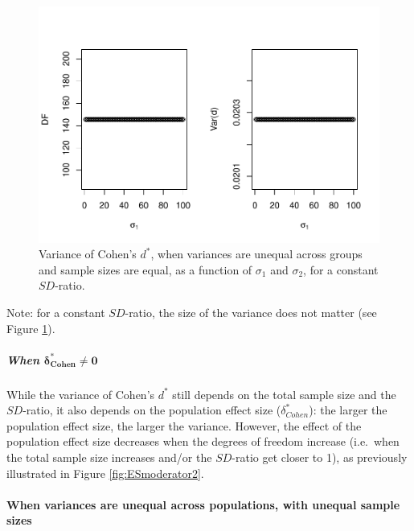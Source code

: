 \documentclass[
  english,
  man,mask]{apa6}
\let\oldparagraph\paragraph
\renewcommand{\paragraph}[1]{\oldparagraph{#1}\mbox{}}
\let\oldsubparagraph\subparagraph
\renewcommand{\subparagraph}[1]{\oldsubparagraph{#1}\mbox{}}
\begin{document}
\begin{figure}
\centering
\includegraphics{Theoretical-Bias-of-all-estimators-as-a-function-of-population-parameters_files/figure-latex/varcohendprimehetbalvariance2-1.pdf}
\caption{\label{fig:varcohendprimehetbalvariance2}Variance of Cohen's \(d^*\), when variances are unequal across groups and sample sizes are equal, as a function of \(\sigma_1\) and \(\sigma_2\), for a constant \(SD\)-ratio.}
\end{figure}

Note: for a constant \(SD\)-ratio, the size of the variance does not matter (see Figure \ref{fig:varcohendprimehetbalvariance2}).

\hypertarget{when-bmdelta_cohen-neq-0-1}{%
\subparagraph{\texorpdfstring{When \(\bm{\delta^*_{Cohen} \neq 0}\)}{When \textbackslash bm\{\textbackslash delta\^{}*\_\{Cohen\} \textbackslash neq 0\}}}\label{when-bmdelta_cohen-neq-0-1}}

While the variance of Cohen's \(d^*\) still depends on the total sample size and the \(SD\)-ratio, it also depends on the population effect size (\(\delta^*_{Cohen}\)): the larger the population effect size, the larger the variance. However, the effect of the population effect size decreases when the degrees of freedom increase (i.e.~when the total sample size increases and/or the \(SD\)-ratio get closer to 1), as previously illustrated in Figure \ref{fig:ESmoderator2}.

\hypertarget{when-variances-are-unequal-across-populations-with-unequal-sample-sizes-3}{%
\paragraph{When variances are unequal across populations, with unequal sample sizes}\label{when-variances-are-unequal-across-populations-with-unequal-sample-sizes-3}}
\end{document}
